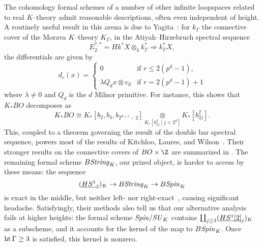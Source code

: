 \begin{remark}
The cohomology formal schemes of a number of other infinite loopspaces related to real $K$--theory admit reasonable descriptions, often even independent of height.  A routinely useful result in this arena is due to Yagita~\cite[Lemma 2.1]{Yagita}: for $k_\Gamma$ the connective cover of the Morava $K$--theory $K_\Gamma$, in the Atiyah--Hirzebruch spectral sequence \[E_2^{*, *} = Hk^* X \otimes_k k_\Gamma^* \Rightarrow k_\Gamma^* X,\] the differentials are given by \[d_r(x) = \begin{cases} 0 & \text{if $r \le 2(p^d - 1)$}, \\ \lambda Q_d x \otimes v_d & \text{if $r = 2(p^d - 1) + 1$} \end{cases}\] where $\lambda \ne 0$ and $Q_d$ is the $d${\th} Milnor primitive.  For instance, this shows that $K_* BO$ decomposes as \[K_* BO \cong K_*[b_2, b_4, b_{2^{d+1}-2}] \underset{K_*[b_{2j}^2 \mid j < 2^d]}{\otimes} K_*[b_{2j}^2].\]  This, coupled to a theorem governing the result of the double bar spectral sequence, powers most of the results of Kitchloo, Laures, and Wilson~\cite[Section 4]{KLW}.  Their stronger results on the connective covers of $BO \times \Z$ are summarized in .  The remaining formal scheme $B\mathit{String}_K$, our prized object, is harder to access by these means: the sequence \[(\underline{\smash{HS^1}}_{2})_K \to B\mathit{String}_K \to B\mathit{Spin}_K\] is exact in the middle, but neither left- nor right-exact~\cite[pg.\ 234]{KLW}, causing significant headache.  Satisfyingly, their methods also tell us that our alternative analysis fails at higher heights: the formal scheme $\mathit{Spin}/\mathit{SU}_K$ contains $\coprod_{j \ge 3} (\underline{\smash{HS^1[2]}}_{j})_K$ as a subscheme, and it accounts for the kernel of the map to $B\mathit{Spin}_K$.  Once $\operatorname{ht} \Gamma \ge 3$ is satisfied, this kernel is nonzero.
\end{remark}

